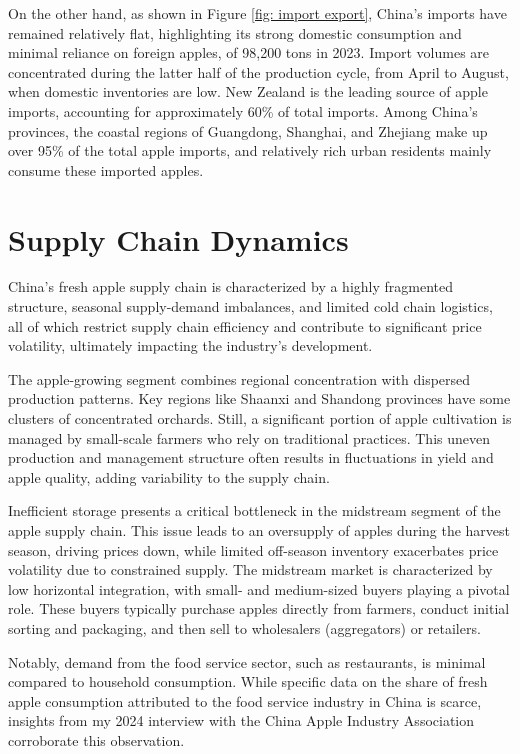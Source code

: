 On the other hand, as shown in Figure \ref{fig: import export}, China's imports have remained relatively flat, highlighting its strong domestic consumption and minimal reliance on foreign apples, of 98,200 tons in 2023.  Import volumes are concentrated during the latter half of the production cycle, from April to August, when domestic inventories are low. New Zealand is the leading source of apple imports, accounting for approximately 60\% of total imports. Among China's provinces, the coastal regions of Guangdong, Shanghai, and Zhejiang make up over 95\% of the total apple imports, and relatively rich urban residents mainly consume these imported apples.





    
\section{Supply Chain Dynamics}
\noindent China's fresh apple supply chain is characterized by a highly fragmented structure, seasonal supply-demand imbalances, and limited cold chain logistics, all of which restrict supply chain efficiency and contribute to significant price volatility, ultimately impacting the industry's development.

The apple-growing segment combines regional concentration with dispersed production patterns. Key regions like Shaanxi and Shandong provinces have some clusters of concentrated orchards. Still, a significant portion of apple cultivation is managed by small-scale farmers who rely on traditional practices. This uneven production and management structure often results in fluctuations in yield and apple quality, adding variability to the supply chain.

Inefficient storage presents a critical bottleneck in the midstream segment of the apple supply chain. This issue leads to an oversupply of apples during the harvest season, driving prices down, while limited off-season inventory exacerbates price volatility due to constrained supply. The midstream market is characterized by low horizontal integration, with small- and medium-sized buyers playing a pivotal role. These buyers typically purchase apples directly from farmers, conduct initial sorting and packaging, and then sell to wholesalers (aggregators) or retailers. 

Notably, demand from the food service sector, such as restaurants, is minimal compared to household consumption. While specific data on the share of fresh apple consumption attributed to the food service industry in China is scarce, insights from my 2024 interview with the China Apple Industry Association corroborate this observation.



